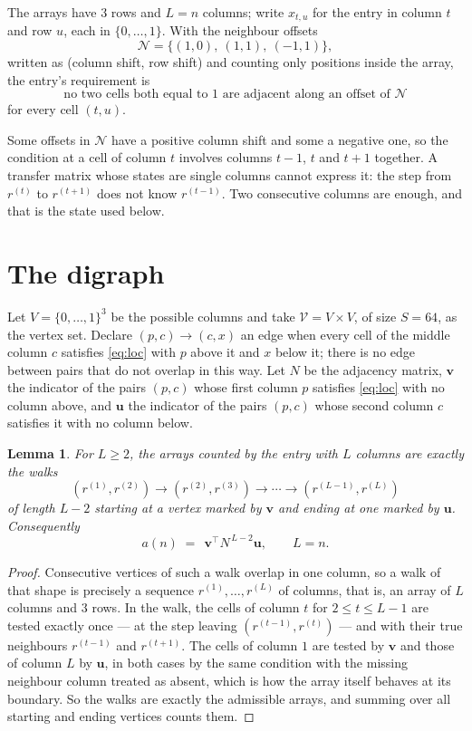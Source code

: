 \documentclass[11pt,a4paper]{article}
\theoremstyle{plain}
\newtheorem{lemma}[theorem]{Lemma}
\theoremstyle{definition}
\begin{document}
The arrays have $3$ rows and $L=n$ columns; write $x_{t,u}$ for the entry in
column $t$ and row $u$, each in $\{0,\dots,1\}$. With the neighbour offsets
\[
\mathcal N=\{(1,0),\ (1,1),\ (-1,1)\},
\]
written as (column shift, row shift) and counting only positions inside the array, the
entry's requirement is
\begin{equation}\label{eq:loc}
\text{no two cells both equal to }1\text{ are adjacent along an offset of }\mathcal N
\end{equation}
for every cell $(t,u)$.

Some offsets in $\mathcal N$ have a positive column shift and some a negative one, so the
condition at a cell of column $t$ involves columns $t-1$, $t$ and $t+1$ together. A transfer
matrix whose states are single columns cannot express it: the step from $r^{(t)}$ to
$r^{(t+1)}$ does not know $r^{(t-1)}$. Two consecutive columns are enough, and that is
the state used below.

\section{The digraph}

Let $V=\{0,\dots,1\}^{3}$ be the possible columns and take
$\mathcal V=V\times V$, of size $S=64$, as the vertex set. Declare $(p,c)\to(c,x)$ an edge
when every cell of the middle column $c$ satisfies \eqref{eq:loc} with $p$ above it and $x$
below it; there is no edge between pairs that do not overlap in this way. Let $N$ be the
adjacency matrix, $\mathbf{v}$ the indicator of the pairs $(p,c)$ whose first column $p$
satisfies \eqref{eq:loc} with no column above, and $\mathbf{u}$ the indicator of
the pairs $(p,c)$ whose second column $c$ satisfies it with no column below.

\begin{lemma}\label{lem:walk}
For $L\ge2$, the arrays counted by the entry with $L$ columns are exactly the walks
\[
(r^{(1)},r^{(2)})\to(r^{(2)},r^{(3)})\to\cdots\to(r^{(L-1)},r^{(L)})
\]
of length $L-2$ starting at a vertex marked by $\mathbf{v}$ and ending at one marked by
$\mathbf{u}$. Consequently
\[
a(n)\;=\;\,\mathbf{v}^{\!\top}N^{\,L-2}\mathbf{u},\qquad L=n .
\]
\end{lemma}

\begin{proof}
Consecutive vertices of such a walk overlap in one column, so a walk of that shape is
precisely a sequence $r^{(1)},\dots,r^{(L)}$ of columns, that is, an array of $L$ columns
and $3$ rows. In the walk, the cells of column $t$ for $2\le t\le L-1$ are tested
exactly once --- at the step leaving $(r^{(t-1)},r^{(t)})$ --- and with their true
neighbours $r^{(t-1)}$ and $r^{(t+1)}$. The cells of column $1$ are tested by
$\mathbf{v}$ and those of column $L$ by $\mathbf{u}$, in both cases by the same condition
with the missing neighbour column treated as absent, which is how the array itself behaves at
its boundary. So the walks are exactly the admissible arrays, and summing over all starting
and ending vertices counts them.
\end{proof}
\end{document}
